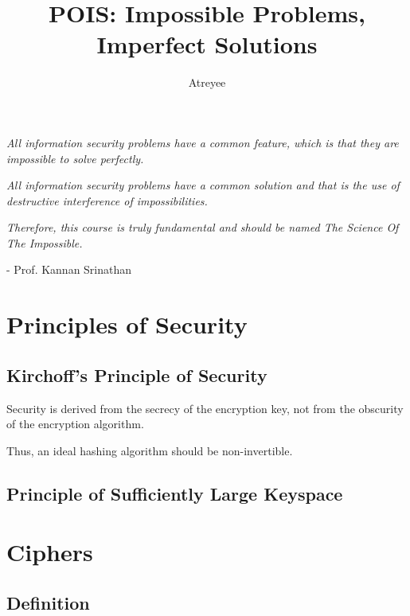 \documentclass[letterpaper,12pt]{article}
\title{POIS: Impossible Problems, Imperfect Solutions}
\author{Atreyee}
\begin{document}
\maketitle

\begin{displayquote}

\textit{All information security problems have a common feature, which is that they are impossible to solve perfectly.}

\end{displayquote}

\begin{displayquote}

\textit{All information security problems have a common solution and that is the use of destructive interference of impossibilities.}

\end{displayquote}

\begin{displayquote}

\textit{Therefore, this course is truly fundamental and should be named The Science Of The Impossible.}

- Prof. Kannan Srinathan 
\end{displayquote}

\section{Principles of Security}

\subsection{Kirchoff's Principle of Security}

Security is derived from the secrecy of the encryption key, not from the obscurity of the encryption algorithm. 

Thus, an ideal hashing algorithm should be non-invertible.

\subsection{Principle of Sufficiently Large Keyspace}

\section{Ciphers}

\subsection{Definition}
\end{document}
